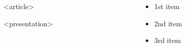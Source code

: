 \documentclass{beamer}
\begin{document}
\begin{frame}
  \begin{columns}
    \begin{column}{.45\columnwidth}
      \begin{onlyenv}<article>
      \end{onlyenv}
      \begin{onlyenv}<presentation>
      \end{onlyenv}
    \end{column}
    \begin{column}{.45\columnwidth}
      \begin{itemize}
      \item 1st item
      \item 2nd item
      \item 3rd item
      \end{itemize}
    \end{column}

  \end{columns}
\end{frame}
\end{document}
